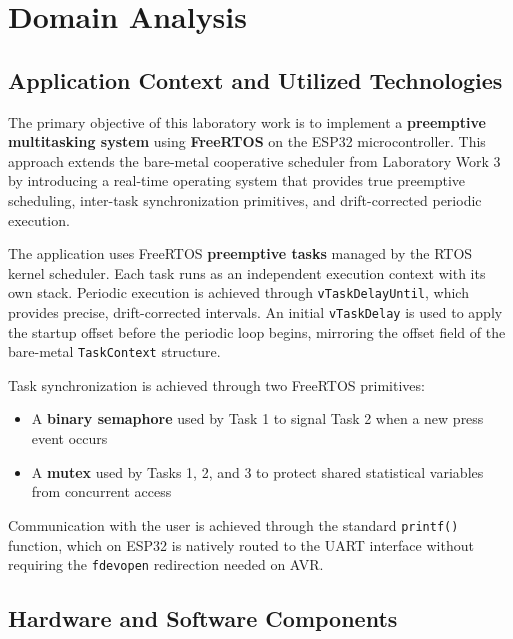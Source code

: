 \section{Domain Analysis}
\subsection{Application Context and Utilized Technologies}
The primary objective of this laboratory work is to implement a \textbf{preemptive multitasking
system} using \textbf{FreeRTOS} on the ESP32 microcontroller. This approach extends the bare-metal
cooperative scheduler from Laboratory Work 3 by introducing a real-time operating system that
provides true preemptive scheduling, inter-task synchronization primitives, and drift-corrected
periodic execution.

The application uses FreeRTOS \textbf{preemptive tasks} managed by the RTOS kernel scheduler.
Each task runs as an independent execution context with its own stack. Periodic execution is
achieved through \texttt{vTaskDelayUntil}, which provides precise, drift-corrected intervals.
An initial \texttt{vTaskDelay} is used to apply the startup offset before the periodic loop begins,
mirroring the offset field of the bare-metal \texttt{TaskContext} structure.

Task synchronization is achieved through two FreeRTOS primitives:
\begin{itemize}
  \item A \textbf{binary semaphore} used by Task 1 to signal Task 2 when a new press event occurs
  \item A \textbf{mutex} used by Tasks 1, 2, and 3 to protect shared statistical variables from
    concurrent access
\end{itemize}

Communication with the user is achieved through the standard \texttt{printf()} function, which on
ESP32 is natively routed to the UART interface without requiring the \texttt{fdevopen} redirection
needed on AVR.

\subsection{Hardware and Software Components}

